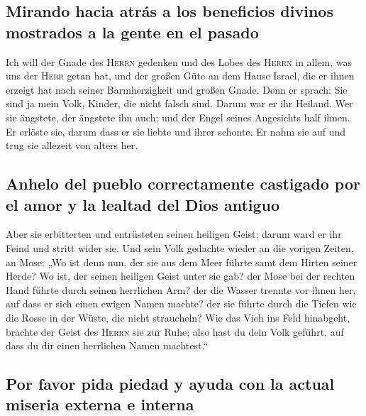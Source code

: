 \hypertarget{mirando-hacia-atruxe1s-a-los-beneficios-divinos-mostrados-a-la-gente-en-el-pasado}{%
\subsection{Mirando hacia atrás a los beneficios divinos mostrados a la
gente en el
pasado}\label{mirando-hacia-atruxe1s-a-los-beneficios-divinos-mostrados-a-la-gente-en-el-pasado}}

 Ich will der Gnade des \textsc{Herrn} gedenken und des
Lobes des \textsc{Herrn} in allem, was uns der \textsc{Herr} getan hat,
und der großen Güte an dem Hause Israel, die er ihnen erzeigt hat nach
seiner Barmherzigkeit und großen Gnade.  Denn er sprach:
Sie sind ja mein Volk, Kinder, die nicht falsch sind. Darum war er ihr
Heiland.  Wer sie ängstete, der ängstete ihn auch; und der
Engel seines Angesichts half ihnen. Er erlöste sie, darum dass er sie
liebte und ihrer schonte. Er nahm sie auf und trug sie allezeit von
alters her.

\hypertarget{anhelo-del-pueblo-correctamente-castigado-por-el-amor-y-la-lealtad-del-dios-antiguo}{%
\subsection{Anhelo del pueblo correctamente castigado por el amor y la
lealtad del Dios
antiguo}\label{anhelo-del-pueblo-correctamente-castigado-por-el-amor-y-la-lealtad-del-dios-antiguo}}

 Aber sie erbitterten und entrüsteten seinen heiligen
Geist; darum ward er ihr Feind und stritt wider sie.  Und
sein Volk gedachte wieder an die vorigen Zeiten, an Mose: „Wo ist denn
nun, der sie aus dem Meer führte samt dem Hirten seiner Herde? Wo ist,
der seinen heiligen Geist unter sie gab?  der Mose bei
der rechten Hand führte durch seinen herrlichen Arm? der die Wasser
trennte vor ihnen her, auf dass er sich einen ewigen Namen machte?
 der sie führte durch die Tiefen wie die Rosse in der
Wüste, die nicht straucheln?  Wie das Vieh ins Feld
hinabgeht, brachte der Geist des \textsc{Herrn} sie zur Ruhe; also hast
du dein Volk geführt, auf dass du dir einen herrlichen Namen machtest.``

\hypertarget{por-favor-pida-piedad-y-ayuda-con-la-actual-miseria-externa-e-interna}{%
\subsection{Por favor pida piedad y ayuda con la actual miseria externa
e
interna}\label{por-favor-pida-piedad-y-ayuda-con-la-actual-miseria-externa-e-interna}}

